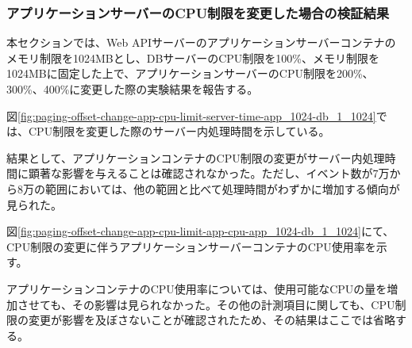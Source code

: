 \documentclass[../../../../main]{subfiles}
\begin{document}
    \subsubsection{アプリケーションサーバーのCPU制限を変更した場合の検証結果}\label{subsubsec:result-paging-offset-change-app-cpu}

    本セクションでは、Web APIサーバーのアプリケーションサーバーコンテナのメモリ制限を1024MBとし、DBサーバーのCPU制限を100\%、メモリ制限を1024MBに固定した上で、アプリケーションサーバーのCPU制限を200\%、300\%、400\%に変更した際の実験結果を報告する。


    図\ref{fig:paging-offset-change-app-cpu-limit-server-time-app_1024-db_1_1024}では、CPU制限を変更した際のサーバー内処理時間を示している。

    

    結果として、アプリケーションコンテナのCPU制限の変更がサーバー内処理時間に顕著な影響を与えることは確認されなかった。ただし、イベント数が7万から8万の範囲においては、他の範囲と比べて処理時間がわずかに増加する傾向が見られた。


    図\ref{fig:paging-offset-change-app-cpu-limit-app-cpu-app_1024-db_1_1024}にて、CPU制限の変更に伴うアプリケーションサーバーコンテナのCPU使用率を示す。

    

    アプリケーションコンテナのCPU使用率については、使用可能なCPUの量を増加させても、その影響は見られなかった。その他の計測項目に関しても、CPU制限の変更が影響を及ぼさないことが確認されたため、その結果はここでは省略する。
\end{document}
